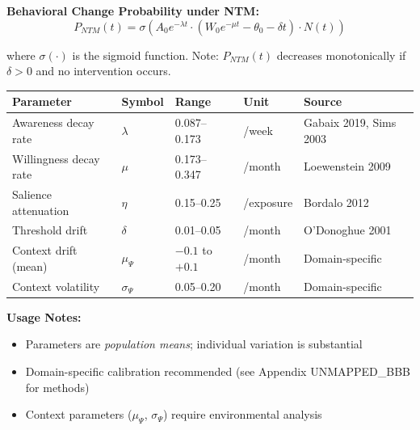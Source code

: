 \documentclass[11pt, a4paper]{article}
\begin{document}
\begin{tcolorbox}[colback=white, colframe=black!75!black,
    title=\textbf{Mathematical Derivation: NTM Decay Functions}]
\textbf{Behavioral Change Probability under NTM:}
\begin{equation}
P_{NTM}(t) = \sigma\left( A_0 e^{-\lambda t} \cdot (W_0 e^{-\mu t} - \theta_0 - \delta t) \cdot N(t) \right)
\label{eq:p-ntm}
\end{equation}

where $\sigma(\cdot)$ is the sigmoid function. Note: $P_{NTM}(t)$ decreases monotonically if $\delta > 0$ and no intervention occurs.

\end{tcolorbox}

\begin{tcolorbox}[colback=gray!5!white, colframe=gray!75!black,
    title=\textbf{Parameter Reference Table: Empirical Ranges}]

\begin{center}
\renewcommand{\arraystretch}{1.3}
\begin{tabular}{@{}lllll@{}}
\toprule
\textbf{Parameter} & \textbf{Symbol} & \textbf{Range} & \textbf{Unit} & \textbf{Source} \\
\midrule
Awareness decay rate & $\lambda$ & 0.087--0.173 & /week & Gabaix 2019, Sims 2003 \\
Willingness decay rate & $\mu$ & 0.173--0.347 & /month & Loewenstein 2009 \\
Salience attenuation & $\eta$ & 0.15--0.25 & /exposure & Bordalo 2012 \\
Threshold drift & $\delta$ & 0.01--0.05 & /month & O'Donoghue 2001 \\
Context drift (mean) & $\mu_\Psi$ & $-0.1$ to $+0.1$ & /month & Domain-specific \\
Context volatility & $\sigma_\Psi$ & 0.05--0.20 & /month & Domain-specific \\
\bottomrule
\end{tabular}
\end{center}

\textbf{Usage Notes:}
\begin{itemize}[nosep]
\item Parameters are \textit{population means}; individual variation is substantial
\item Domain-specific calibration recommended (see Appendix UNMAPPED_BBB for methods)
\item Context parameters ($\mu_\Psi$, $\sigma_\Psi$) require environmental analysis
\end{itemize}

\end{tcolorbox}
\end{document}
